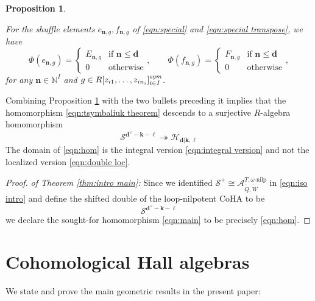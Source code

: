 \documentclass{amsart}
\newtheorem{proposition}[theorem]{Proposition}
\def\CH{{\mathcal{H}}}
\def\CS{{\mathcal{S}}}
\def\bd{{\mathbf{d}}}
\def\bk{{\mathbf{k}}}
\def\bell{\boldsymbol{\ell}}
\def\nn{{\mathbb{N}^I}}
\def\bn{{\boldsymbol{n}}}
\def\tQ{\tilde{Q}}
\def\tW{\tilde{W}}
\def\ring{R}
\def\eTs{\Phi}
\def\kha{\mathcal{A}^{T,\omega\text{-nilp}}_{\tQ,\tW}}
\begin{document}
\begin{proposition}
\label{prop:key}

For the shuffle elements $e_{\bn,g}, f_{\bn,g}$ of \eqref{eqn:special} and \eqref{eqn:special transpose}, we have
$$
\eTs(e_{\bn,g}) = \begin{cases} E_{\bn,g} &\text{if } \bn \leq \bd \\ 0&\text{otherwise} \end{cases}, \qquad \eTs(f_{\bn,g}) = \begin{cases} F_{\bn,g} &\text{if } \bn \leq \bd \\ 0&\text{otherwise} \end{cases},
$$
for any $\bn \in \nn$ and $g \in \ring[z_{i1},\dots,z_{in_i}]^{\emph{sym}}_{i \in I}$.


\end{proposition}

\medskip 

\noindent Combining Proposition \ref{prop:key} with the two bullets preceding it implies that the homomorphism \eqref{eqn:tsymbaliuk theorem} descends to a surjective $\ring$-algebra homomorphism
\begin{equation}
\label{eqn:hom}
\CS^{\bd^\vee - \bk - \bell} \twoheadrightarrow \CH_{\bd|\bk,\bell}
\end{equation}
The domain of \eqref{eqn:hom} is the integral version \eqref{eqn:integral version} and not the localized version \eqref{eqn:double loc}. 

\medskip 

\begin{proof} \emph{of Theorem \ref{thm:intro main}:} Since we identified $\CS^+\cong \kha$ in \eqref{eqn:iso intro} and define the shifted double of the loop-nilpotent CoHA to be
$$
\CS^{\bd^\vee-\bk-\bell}
$$
we declare the sought-for homomorphism \eqref{eqn:main} to be precisely \eqref{eqn:hom}. \end{proof}

\bigskip

\section{Cohomological Hall algebras}
\label{sec:coha}

\medskip

\noindent We state and prove the main geometric results in the present paper:

\medskip 
\end{document}
